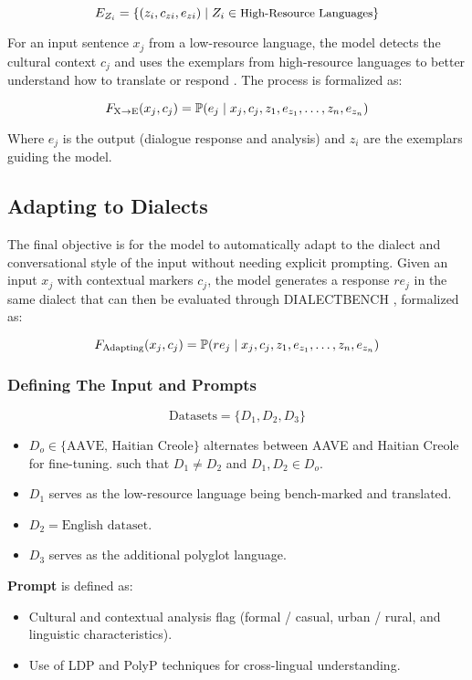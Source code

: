 \[
\small
E_{Z_i} = \{(z_i, c_{zi}, e_{zi}) \mid Z_i \in \text{High-Resource Languages}\}
\]

For an input sentence \(x_j\) from a low-resource language, the model detects the cultural context \(c_j\) and uses the exemplars from high-resource languages to better understand how to translate or respond \cite{Nguyen:24}. The process is formalized as:

\[
\small
F_{\text{X} \to \text{E}}(x_j, c_j) = \mathbb{P}(e_j \mid x_j, c_j, z_1, e_{z_1}, \dots, z_n, e_{z_n})
\]

Where \(e_j\) is the output (dialogue response and analysis) and \(z_i\) are the exemplars guiding the model.

\subsection{Adapting to Dialects}

The final objective is for the model to automatically adapt to the dialect and conversational style of the input without needing explicit prompting. Given an input \(x_j\) with contextual markers \(c_j\), the model generates a response \(re_j\) in the same dialect that can then be evaluated through DIALECTBENCH \cite{Faisal:24}, formalized as:

\[
\small
F_{\text{Adapting}}(x_j, c_j) = \mathbb{P}(re_j \mid x_j, c_j, z_1, e_{z_1}, \dots, z_n, e_{z_n})
\]

\subsubsection{Defining The Input and Prompts}

\[
\text{Datasets} = \{D_1, D_2, D_3\}
\]

\begin{itemize}
    \item \(D_o \in \{\text{AAVE, Haitian Creole}\}\) alternates between AAVE and Haitian Creole for fine-tuning. such that $D_1 \neq D_2$ and $D_1, D_2 \in D_o$.
    \item \(D_1 \) serves as the low-resource language being bench-marked and translated.
    \item \(D_2 = \text{English dataset}\).
    \item \(D_3\) serves as the additional polyglot language.
\end{itemize}

\textbf{Prompt} is defined as:
\begin{itemize}
    \item Cultural and contextual analysis flag (formal / casual, urban / rural, and linguistic characteristics).
    \item Use of LDP and PolyP techniques for cross-lingual understanding.
\end{itemize}

